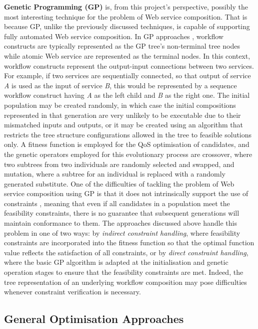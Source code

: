 \textbf{Genetic Programming (GP)} is, from this project's perspective, possibly the most interesting technique for the problem of Web service composition. That is because GP, unlike the previously discussed techniques, is capable of supporting fully automated Web service composition. In GP approaches \cite{aversano2006genetic,rodriguez2010composition}, workflow constructs are typically represented as the GP tree's non-terminal tree nodes while atomic Web service are represented as the terminal nodes. In this context, workflow constructs represent the output-input connections between two services. For example, if two services are sequentially connected, so that output of service \textit{A} is used as the input of service \textit{B}, this would be represented by a sequence workflow construct having \textit{A} as the left child and \textit{B} as the right one. The initial population may be created randomly, in which case the initial compositions represented in that generation are very unlikely to be executable due to their mismatched inputs and outputs, or it may be created using an algorithm that restricts the tree structure configurations allowed in the tree to feasible solutions only. A fitness function is employed for the QoS optimisation of candidates, and the genetic operators employed for this evolutionary process are crossover, where two subtrees from two individuals are randomly selected and swapped, and mutation, where a subtree for an individual is replaced with a randomly generated substitute. One of the difficulties of tackling the problem of Web service composition using GP is that it does not intrinsically support the use of constraints \cite{craenen2001handle}, meaning that even if all candidates in a population meet the feasibility constraints, there is no guarantee that subsequent generations will maintain conformance to them. The approaches discussed above handle this problem in one of two ways: by \textit{indirect constraint handling}, where feasibility constraints are incorporated into the fitness function so that the optimal function value reflects the satisfaction of all constraints, or by \textit{direct constraint handling}, where the basic GP algorithm is adapted at the initialisation and genetic operation stages to ensure that the feasibility constraints are met. Indeed, the tree representation of an underlying workflow composition may pose difficulties whenever constraint verification is necessary.

\subsection{General Optimisation Approaches}


